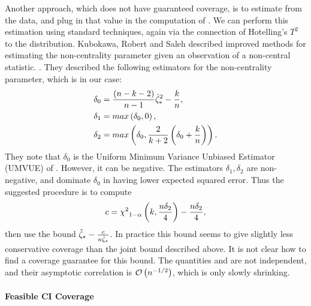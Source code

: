 \documentclass[10pt,a4paper,english]{article}
\theoremstyle{plain}
\theoremstyle{definition}
\newtheorem{example}{Example}[section]
\theoremstyle{remark}
\providecommand{\cono}[1][\typeI]{\mathSUB{c}{#1}}
\providecommand{\dftwo}{\ssiz-\nstrat}
\begin{document}
Another approach, which does not have guaranteed coverage, is to
estimate \psnropt from the data, and plug in that value in the computation of
\cono[\typeI].
We can perform this estimation using standard techniques, 
again via the connection of Hotelling's $T^2$ to the \flaw{} distribution.
Kubokawa, Robert and Saleh described improved methods for estimating
the non-centrality parameter given an observation of a non-central
\flaw{} statistic. \cite{kubokawa1993estimation}.
They described the following estimators for the non-centrality parameter,
which is \psnrsqopt in our case:
\begin{equation}
\label{eqn:KRS_estimators}
\begin{split}
	\delta_0 &= \frac{\wrapParens{\dftwo-2}}{\ssiz-1}\ssrsqopt - \frac{\nstrat}{\ssiz},\\
	\delta_1 &= \fmax{\delta_0,0},\\
	\delta_2 &= \fmax{\delta_0,\frac{2}{\nstrat+2}\wrapParens{\delta_0 + \frac{\nstrat}{\ssiz}}}.
\end{split}
\end{equation}
They note that $\delta_0$ is the Uniform Minimum Variance Unbiased Estimator (UMVUE) of \psnrsqopt.
However, it can be negative.
The estimators $\delta_1, \delta_2$ are non-negative, and dominate $\delta_0$ in having
lower expected squared error.
Thus the suggested procedure is to compute
$$
c = \chisqqnt{1-\typeI}{\nstrat, \frac{\ssiz\delta_2}{4}} - \frac{\ssiz\delta_2}{4},
$$
then use the bound $\ssropt - \frac{c}{\ssiz\ssropt}$.
In practice this bound seems to give slightly less conservative coverage than
the joint bound described above.
It is not clear how to find a coverage guarantee for this bound.
The quantities \ssrsqopt and \psnr[a] are not independent, 
and their asymptotic correlation is $\bigo{\ssiz^{-\halff}}$, which is only slowly shrinking. \cite{pav2013markowitz}

\paragraph{Feasible CI Coverage}
\end{document}
